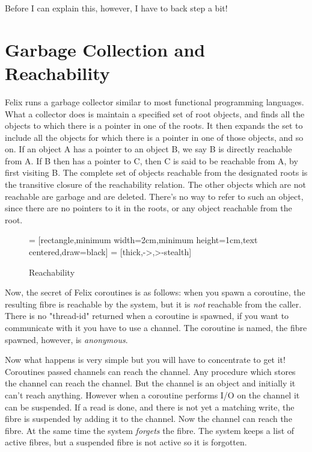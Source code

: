 \documentclass[oneside]{book}
\begin{document}
Before I can explain this, however, I have to back step a bit!

\section{Garbage Collection and Reachability}
Felix runs a garbage collector similar to most functional programming
languages. What a collector does is maintain a specified set of root
objects, and finds all the objects to which there is a pointer
in one of the roots. It then expands the set to include all the objects
for which there is a pointer in one of those objects, and so on.
If an object A has a pointer to an object B, we say B is directly
reachable from A. If B then has a pointer to C, then C is said to be
reachable from A, by first visiting B. The complete set of objects
reachable from the designated roots is the transitive closure of the
reachability relation. The other objects which are not reachable
are garbage and are deleted. There's no way to refer to such an object,
since there are no pointers to it in the roots, or any object reachable
from the root.

\begin{figure}[h]
\begin{center}
 = [rectangle,minimum width=2cm,minimum height=1cm,text centered,draw=black]
 = [thick,->,>-stealth]
\caption{Reachability}
\end{center}
\end{figure}

Now, the secret of Felix coroutines is as follows: when you spawn
a coroutine, the resulting fibre is reachable by the system,
but it is {\em not} reachable from the caller. There is no "thread-id"
returned when a coroutine is spawned, if you want to communicate
with it you have to use a channel. The coroutine is named, the 
fibre spawned, however, is {\em anonymous}.

Now what happens is very simple but you will have to concentrate
to get it! Coroutines passed channels can reach the channel.
Any procedure which stores the channel can reach the channel.
But the channel is an object and initially it can't reach anything.
However when a coroutine performs I/O on the channel it can be
suspended. If a read is done, and there is not yet a matching write,
the fibre is suspended by adding it to the channel. Now the channel
can reach the fibre. At the same time the system {\em forgets} the
fibre. The system keeps a list of active fibres, but a suspended
fibre is not active so it is forgotten.
\end{document}
